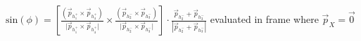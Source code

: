 \documentclass[border={2pt 1pt 2pt 1pt}]{standalone}
\begin{document}
$\mathrm{sin}(\phi) = \left[ \frac{(\vec{p}_{h_1^+}\times\vec{p}_{h_4^+})}{\lvert\vec{p}_{h_1^+}\times\vec{p}_{h_4^+}\rvert}\times\frac{(\vec{p}_{h_2^-}\times\vec{p}_{h_3^-})}{\lvert\vec{p}_{h_2^-}\times\vec{p}_{h_3^-}\rvert} \right]\cdot\frac{\vec{p}_{h_2^-}+\vec{p}_{h_3^-}}{|\vec{p}_{h_2^-}+\vec{p}_{h_3^-}|}$ \quad
evaluated in frame where $\vec{p}_{X} = \vec{0}$
\end{document}
